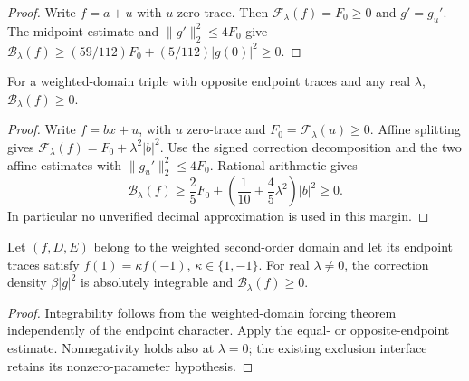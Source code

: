 \begin{proof}
\leanok
Write $f=a+u$ with $u$ zero-trace.
Then $\mathcal F_\lambda(f)=F_0\ge0$ and $g'=g_u'$.
The midpoint estimate and $\|g'\|_2^2\le4F_0$ give
$\mathcal B_\lambda(f)\ge(59/112)F_0+(5/112)|g(0)|^2\ge0$.
\end{proof}

\begin{lemma}
\label{lem:corrected-opposite-endpoints}
\leanok
For a weighted-domain triple with opposite endpoint traces and any real
$\lambda$, $\mathcal B_\lambda(f)\ge0$.
\end{lemma}

\begin{proof}
\leanok
Write $f=bx+u$, with $u$ zero-trace and $F_0=\mathcal F_\lambda(u)\ge0$.
Affine splitting gives $\mathcal F_\lambda(f)=F_0+\lambda^2|b|^2$.
Use the signed correction decomposition and the two affine estimates with
$\|g_u'\|_2^2\le4F_0$. Rational arithmetic gives
\[
 \mathcal B_\lambda(f)\ge\frac25F_0+
       \left(\frac1{10}+\frac45\lambda^2\right)|b|^2\ge0.
\]
In particular no unverified decimal approximation is used in this margin.
\end{proof}

\begin{lemma}
\label{lem:corrected-trace-nonneg}
\leanok
Let $(f,D,E)$ belong to the weighted second-order domain and let its
endpoint traces satisfy $f(1)=\kappa f(-1)$, $\kappa\in\{1,-1\}$.
For real $\lambda\ne0$, the correction density $\beta|g|^2$ is absolutely
integrable and $\mathcal B_\lambda(f)\ge0$.
\end{lemma}

\begin{proof}
\leanok
Integrability follows from the weighted-domain forcing theorem independently
of the endpoint character. Apply the equal- or opposite-endpoint estimate.
Nonnegativity holds also at $\lambda=0$; the existing exclusion interface
retains its nonzero-parameter hypothesis.
\end{proof}

